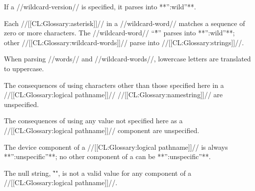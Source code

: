 If a //wildcard-version// is specified,
it parses into **'':wild''**.

\endsubsubsubsection%


Each //[[CL:Glossary:asterisk]]// in a //wildcard-word// matches a sequence of 
zero or more characters.  The //wildcard-word// ``\f{*}'' 
parses into **'':wild''**; other //[[CL:Glossary:wildcard-words]]// parse into //[[CL:Glossary:strings]]//.
 
\endsubsubsubsection%


When parsing //words// and //wildcard-words//,
lowercase letters are translated to uppercase.

\endsubsubsubsection%


The consequences of using characters other than those specified here
in a //[[CL:Glossary:logical pathname]]// //[[CL:Glossary:namestring]]// are unspecified.



The consequences of using any value not specified here as a 
//[[CL:Glossary:logical pathname]]// component are unspecified.

\endsubsubsubsection%





\endsubsubsection%

\endSubsection%



The device component of a //[[CL:Glossary:logical pathname]]// is always **'':unspecific''**;
no other component of a  can be **'':unspecific''**.  

\endsubsubsection%


The null string, \f{""}, is not a valid value for any component of a //[[CL:Glossary:logical pathname]]//.














\endsubsubsection%

\endSubsection%
